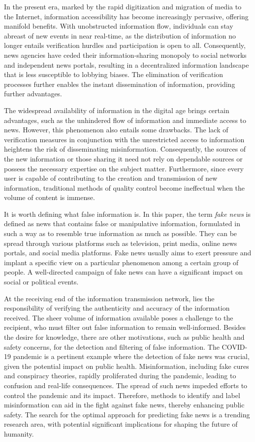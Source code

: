 In the present era, marked by the rapid digitization and migration of media to the Internet, information accessibility has become increasingly pervasive, offering manifold benefits. With unobstructed information flow, individuals can stay abreast of new events in near real-time, as the distribution of information no longer entails verification hurdles and participation is open to all. Consequently, news agencies have ceded their information-sharing monopoly to social networks and independent news portals, resulting in a decentralized information landscape that is less susceptible to lobbying biases. The elimination of verification processes further enables the instant dissemination of information, providing further advantages.

The widespread availability of information in the digital age brings certain advantages, such as the unhindered flow of information and immediate access to news. However, this phenomenon also entails some drawbacks. The lack of verification measures in conjunction with the unrestricted access to information heightens the risk of disseminating misinformation. Consequently, the sources of the new information or those sharing it need not rely on dependable sources or possess the necessary expertise on the subject matter. Furthermore, since every user is capable of contributing to the creation and transmission of new information, traditional methods of quality control become ineffectual when the volume of content is immense.

It is worth defining what false information is. In this paper, the term \textit{fake news} is defined as news that contains false or manipulative information, formulated in such a way as to resemble true information as much as possible. They can be spread through various platforms such as television, print media, online news portals, and social media platforms. Fake news usually aims to exert pressure and implant a specific view on a particular phenomenon among a certain group of people. A well-directed campaign of fake news can have a significant impact on social or political events.

At the receiving end of the information transmission network, lies the responsibility of verifying the authenticity and accuracy of the information received. The sheer volume of information available poses a challenge to the recipient, who must filter out false information to remain well-informed. Besides the desire for knowledge, there are other motivations, such as public health and safety concerns, for the detection and filtering of false information. The COVID-19 pandemic is a pertinent example where the detection of fake news was crucial, given the potential impact on public health. Misinformation, including fake cures and conspiracy theories, rapidly proliferated during the pandemic, leading to confusion and real-life consequences. The spread of such news impeded efforts to control the pandemic and its impact. Therefore, methods to identify and label misinformation can aid in the fight against fake news, thereby enhancing public safety. The search for the optimal approach for predicting fake news is a trending research area, with potential significant implications for shaping the future of humanity.

